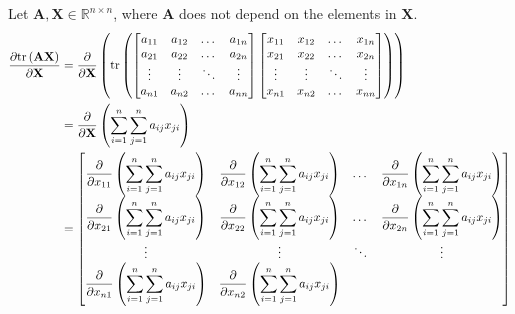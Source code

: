 \documentclass{article}
\newcommand{\tr}[1]{\ensuremath{\textnormal{tr}\left(#1\right)}} %
\begin{document}
Let \(\mathbf{A}, \mathbf{X} \in \mathbb{R}^{n\times n}\), where \(\mathbf{A}\) does not depend on the elements in \(\mathbf{X}\).
\begin{align*}
    \dfrac{\partial \textnormal{tr}\left(\mathbf{A} \mathbf{X}\right)}{\partial \mathbf{X}} &= \dfrac{\partial}{\partial \mathbf{X}} \left( \tr{\begin{bmatrix}
        a_{11} & a_{12} & \dots & a_{1n} \\
        a_{21} & a_{22} & \dots & a_{2n} \\
        \vdots & \vdots & \ddots & \vdots \\
        a_{n1} & a_{n2} & \dots & a_{nn} \\
    \end{bmatrix}
    \begin{bmatrix}
        x_{11} & x_{12} & \dots & x_{1n} \\
        x_{21} & x_{22} & \dots & x_{2n} \\
        \vdots & \vdots & \ddots & \vdots \\
        x_{n1} & x_{n2} & \dots & x_{nn} \\
    \end{bmatrix} \right)} \\
    &= \dfrac{\partial}{\partial \mathbf{X}} \left( \sum_{i = 1}^{n} \sum_{j = 1}^{n} a_{ij}x_{ji} \right) \\
    &= \begin{bmatrix}
        \displaystyle \dfrac{\partial}{\partial x_{11}} \left( \sum_{i = 1}^{n} \sum_{j = 1}^{n} a_{ij}x_{ji} \right) & 
        \displaystyle \dfrac{\partial}{\partial x_{12}} \left( \sum_{i = 1}^{n} \sum_{j = 1}^{n} a_{ij}x_{ji} \right) & 
        \dots & 
        \displaystyle \dfrac{\partial}{\partial x_{1n}} \left( \sum_{i = 1}^{n} \sum_{j = 1}^{n} a_{ij}x_{ji} \right) \\
        \displaystyle \dfrac{\partial}{\partial x_{21}} \left( \sum_{i = 1}^{n} \sum_{j = 1}^{n} a_{ij}x_{ji} \right) & 
        \displaystyle \dfrac{\partial}{\partial x_{22}} \left( \sum_{i = 1}^{n} \sum_{j = 1}^{n} a_{ij}x_{ji} \right) & 
        \dots & 
        \displaystyle \dfrac{\partial}{\partial x_{2n}} \left( \sum_{i = 1}^{n} \sum_{j = 1}^{n} a_{ij}x_{ji} \right) \\
        \vdots & \vdots & \ddots & \vdots \\
        \displaystyle \dfrac{\partial}{\partial x_{n1}} \left( \sum_{i = 1}^{n} \sum_{j = 1}^{n} a_{ij}x_{ji} \right) & 
        \displaystyle \dfrac{\partial}{\partial x_{n2}} \left( \sum_{i = 1}^{n} \sum_{j = 1}^{n} a_{ij}x_{ji} \right) & 

\end{bmatrix}
\end{align*}
\end{document}
